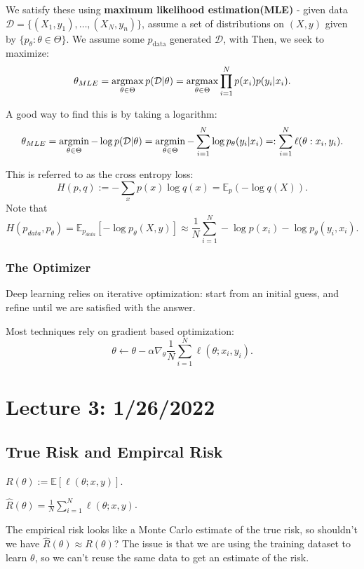 \documentclass[11pt]{scrartcl}
\let \hat \widehat
\let \mc \mathcal
\let \mb \mathbb
\newcommand{\1}{\textbf{1}} %
\begin{document}
We satisfy these using \textbf{maximum likelihood estimation(MLE)} - given data $\mc D = \{(X_1, y_1), \dots, (X_N, y_n)\}$, assume a set of distributions on $(X, y)$ given by $\{p_\theta: \theta \in \Theta\}$.  We assume some $p_{\text{data}}$ generated $\mc D$, with  Then, we seek to maximize:
$$\theta_{MLE} = \argmax_{\theta \in \Theta} p(\mc D | \theta) = \argmax_{\theta \in \Theta} \prod_{i=1}^N p(x_i)p(y_i | x_i).$$

A good way to find this is by taking a logarithm:
$$\theta_{MLE} = \argmin_{\theta \in \Theta} -\log p(\mc D | \theta) = \argmin_{\theta \in \Theta} -\sum_{i=1}^N\log p_\theta(y_i | x_i)  =: \sum_{i=1}^N\ell(\theta: x_i, y_i).$$

This is referred to as the cross entropy loss:
$$H(p, q) := -\sum_{x} p(x)\log q(x) = \mb E_p (-\log q(X)).$$
Note that 
$$H(p_{data}, p_\theta) = \mb E_{p_{data}}[-\log p_\theta(X, y)] \approx \frac{1}{N} \sum_{i=1}^N - \log p(x_i) - \log p_\theta(y_i, x_i).$$

\subsubsection{The Optimizer}
Deep learning relies on iterative optimization: start from an initial guess, and refine until we are satisfied with the answer.

Most techniques rely on gradient based optimization:
$$\theta \leftarrow \theta - \alpha \nabla_\theta \frac{1}{N} \sum_{i=1}^N \ell(\theta; x_i, y_i).$$

\pagebreak
\section{Lecture 3: 1/26/2022}
\subsection{True Risk and Empircal Risk}
\begin{definition}[Risk] $R(\theta) := \mb E[\ell(\theta; x, y)]$.
\end{definition}

\begin{definition} $\hat{R}(\theta) = \frac{1}{N} \sum_{i=1}^N \ell(\theta; x, y)$.
\end{definition}

The empirical risk looks like a Monte Carlo estimate of the true risk, so shouldn't we have $\hat{R}(\theta) \approx R(\theta)$?  The issue is that we are using the training dataset to learn $\theta$, so we can't reuse the same data to get an estimate of the risk.
\end{document}
